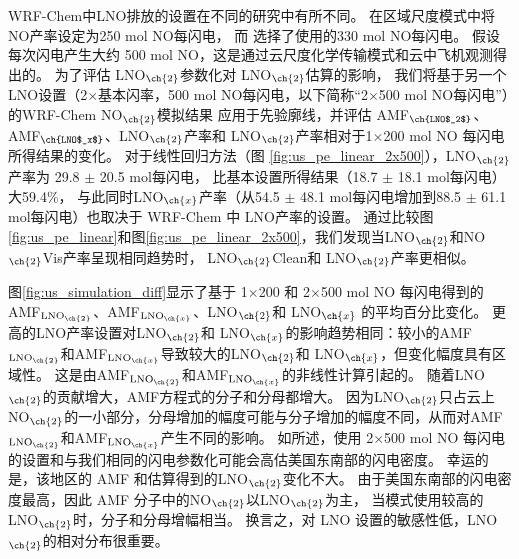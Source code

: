 WRF-Chem中LNO排放的设置在不同的研究中有所不同。
\citet{Zhao.2009}在区域尺度模式中将NO产率设定为250 mol NO每闪电，
而 \citet{Bela.2016}选择了\citet{Barth.2012}使用的330 mol NO每闪电。
\citet{Wang.2015a}假设每次闪电产生大约 500 mol NO，这是通过云尺度化学传输模式和云中飞机观测得出的\citep{Ott.2010}。
为了评估 LNO$_{\ch{2}}$参数化对 LNO$_{\ch{2}}$估算的影响，
我们将基于另一个LNO设置（2$\times$基本闪率，500 mol NO每闪电，以下简称“2$\times$500 mol NO每闪电”）的WRF-Chem NO$_{\ch{2}}$模拟结果
应用于先验廓线，并评估 AMF$_{\ch{LNO$_2$}}$、AMF$_{\ch{LNO$_x$}}$、LNO$_{\ch{2}}$产率和 LNO$_{\ch{2}}$产率相对于1$\times$200 mol NO 每闪电所得结果的变化。
对于线性回归方法（图 \ref{fig:us_pe_linear_2x500}），LNO$_{\ch{2}}$产率为 29.8 $\pm$ 20.5 mol每闪电，
比基本设置所得结果（18.7 $\pm$ 18.1 mol每闪电）大59.4\%，
与此同时LNO$_{\ch{x}}$产率（从54.5 $\pm$ 48.1 mol每闪电增加到88.5 $\pm$ 61.1 mol每闪电）也取决于 WRF-Chem 中 LNO产率的设置。
通过比较图\ref{fig:us_pe_linear}和图\ref{fig:us_pe_linear_2x500}，我们发现当LNO$_{\ch{2}}$和NO$_{\ch{2}}$Vis产率呈现相同趋势时，
LNO$_{\ch{2}}$Clean和 LNO$_{\ch{2}}$产率更相似。


图\ref{fig:us_simulation_diff}显示了基于 1$\times$200 和 2$\times$500 mol NO 每闪电得到的AMF$_\textrm{LNO$_{\ch{2}}$}$、AMF$_\textrm{LNO$_{\ch{x}}$}$、LNO$_{\ch{2}}$和 LNO$_{\ch{x}}$ 的平均百分比变化。
更高的LNO产率设置对LNO$_{\ch{2}}$和 LNO$_{\ch{x}}$的影响趋势相同：较小的AMF$_\textrm{LNO$_{\ch{2}}$}$和AMF$_\textrm{LNO$_{\ch{x}}$}$导致较大的LNO$_{\ch{2}}$和 LNO$_{\ch{x}}$，但变化幅度具有区域性。
这是由AMF$_\textrm{LNO$_{\ch{2}}$}$和AMF$_\textrm{LNO$_{\ch{x}}$}$的非线性计算引起的。
随着LNO$_{\ch{2}}$的贡献增大，AMF方程式的分子和分母都增大。
因为LNO$_{\ch{2}}$只占云上NO$_{\ch{2}}$的一小部分，分母增加的幅度可能与分子增加的幅度不同，从而对AMF$_\textrm{LNO$_{\ch{2}}$}$和AMF$_\textrm{LNO$_{\ch{x}}$}$产生不同的影响。
如\citet{Zhu.2019}所述，使用 2$\times$500 mol NO 每闪电的设置和与我们相同的闪电参数化可能会高估美国东南部的闪电密度。
幸运的是，该地区的 AMF 和估算得到的LNO$_{\ch{2}}$变化不大。
由于美国东南部的闪电密度最高，因此 AMF 分子中的NO$_{\ch{2}}$以LNO$_{\ch{2}}$为主，
当模式使用较高的LNO$_{\ch{2}}$时，分子和分母增幅相当。
换言之，对 LNO 设置的敏感性低，LNO$_{\ch{2}}$的相对分布很重要。


